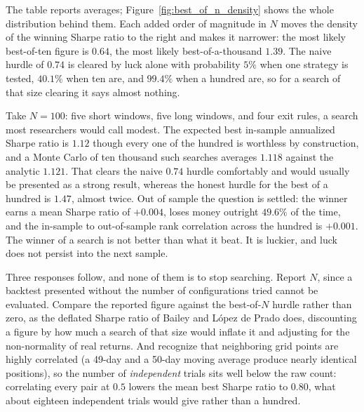 \documentclass[../ai_in_finance]{subfiles}
\begin{document}
\begin{bookfigure}
\end{bookfigure}

The table reports averages; Figure~\ref{fig:best_of_n_density} shows the whole distribution behind them. Each added order of magnitude in $N$ moves the density of the winning Sharpe ratio to the right and makes it narrower: the most likely best-of-ten figure is $0.64$, the most likely best-of-a-thousand $1.39$. The naive hurdle of $0.74$ is cleared by luck alone with probability $5\%$ when one strategy is tested, $40.1\%$ when ten are, and $99.4\%$ when a hundred are, so for a search of that size clearing it says almost nothing.


Take $N = 100$: five short windows, five long windows, and four exit rules, a search most researchers would call modest. The expected best in-sample annualized Sharpe ratio is $1.12$ though every one of the hundred is worthless by construction, and a Monte Carlo of ten thousand such searches averages $1.118$ against the analytic $1.121$. That clears the naive $0.74$ hurdle comfortably and would usually be presented as a strong result, whereas the honest hurdle for the best of a hundred is $1.47$, almost twice. Out of sample the question is settled: the winner earns a mean Sharpe ratio of $+0.004$, loses money outright $49.6\%$ of the time, and the in-sample to out-of-sample rank correlation across the hundred is $+0.001$. The winner of a search is not better than what it beat. It is luckier, and luck does not persist into the next sample.

Three responses follow, and none of them is to stop searching. Report $N$, since a backtest presented without the number of configurations tried cannot be evaluated. Compare the reported figure against the best-of-$N$ hurdle rather than zero, as the deflated Sharpe ratio of Bailey and L\'opez de Prado does, discounting a figure by how much a search of that size would inflate it and adjusting for the non-normality of real returns. And recognize that neighboring grid points are highly correlated (a 49-day and a 50-day moving average produce nearly identical positions), so the number of \emph{independent} trials sits well below the raw count: correlating every pair at $0.5$ lowers the mean best Sharpe ratio to $0.80$, what about eighteen independent trials would give rather than a hundred.
\end{document}
